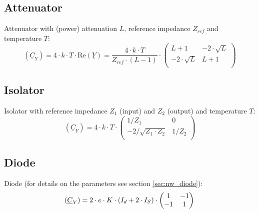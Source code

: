 \subsection{Attenuator}

Attenuator with (power) attenuation $L$, reference impedance $Z_{ref}$
and temperature $T$:
\begin{equation}
(\underline{C}_Y) = 4\cdot k\cdot T\cdot \textrm{Re}\left(\underline{Y}\right)
 = \frac{4\cdot k\cdot T}{Z_{ref}\cdot (L-1)} \cdot
\begin{pmatrix}
 L+1            & -2\cdot\sqrt{L} \\
-2\cdot\sqrt{L} &  L+1 \\
\end{pmatrix}
\end{equation}

\subsection{Isolator}

Isolator with reference impedance $Z_1$ (input) and $Z_2$ (output) and
temperature $T$:
\begin{equation}
(\underline{C}_Y) = 4\cdot k\cdot T\cdot
\begin{pmatrix}
 1/Z_1                 & 0 \\
-2/\sqrt{Z_1\cdot Z_2} &  1/Z_2 \\
\end{pmatrix}
\end{equation}

\subsection{Diode}

Diode (for details on the parameters see section \ref{sec:nw_diode}):
\begin{equation}
(\underline{C}_Y)
 = 2\cdot e\cdot K\cdot \left(I_{d} + 2\cdot I_{S}\right)\cdot
\begin{pmatrix}
   1 & -1\\
  -1 &  1\\
\end{pmatrix}\\
\end{equation}
